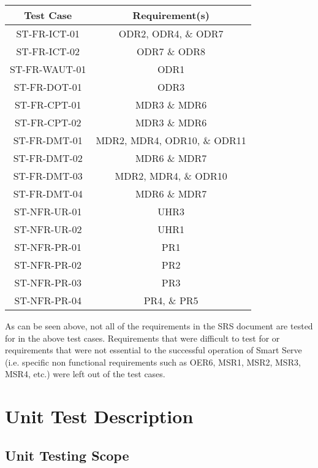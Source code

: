 \documentclass[12pt, titlepage]{article}
\begin{document}
\begin{center}
\begin{tabular}{||c c||} 
 \hline
 Test Case & Requirement(s)  \\ [0.5ex] 
 \hline\hline
 ST-FR-ICT-01 & ODR2, ODR4, \& ODR7 \\ 
 \hline
 ST-FR-ICT-02 & ODR7 \& ODR8 \\ 
 \hline
 ST-FR-WAUT-01 & ODR1\\ 
 \hline
 ST-FR-DOT-01 & ODR3 \\  
 \hline
 ST-FR-CPT-01 & MDR3 \& MDR6 \\ 
 \hline 
 ST-FR-CPT-02 & MDR3 \& MDR6 \\ 
 \hline
 ST-FR-DMT-01 & MDR2, MDR4, ODR10, \& ODR11 \\ 
 \hline
 ST-FR-DMT-02 & MDR6 \& MDR7 \\ 
 \hline
 ST-FR-DMT-03 & MDR2, MDR4, \& ODR10 \\ 
 \hline
 ST-FR-DMT-04 & MDR6 \& MDR7 \\ 
 \hline
 ST-NFR-UR-01 & UHR3  \\ 
 \hline
 ST-NFR-UR-02 & UHR1 \\
 \hline
 ST-NFR-PR-01 & PR1  \\
 \hline
 ST-NFR-PR-02 & PR2 \\
 \hline
 ST-NFR-PR-03 & PR3 \\ [1ex] 
 \hline
 ST-NFR-PR-04 & PR4, \& PR5 \\ [1ex] 
 \hline
\end{tabular}
\end{center}

As can be seen above, not all of the requirements in the SRS document are tested for in the above test cases. Requirements that were difficult to test for or requirements that were not essential to the successful operation of Smart Serve (i.e. specific non functional requirements such as OER6, MSR1, MSR2, MSR3, MSR4, etc.) were left out of the test cases.


  
\newpage
\section{Unit Test Description}

\subsection{Unit Testing Scope}
\end{document}
